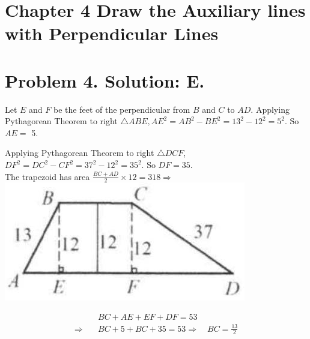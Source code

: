 \documentclass[10pt]{article}
\begin{document}
\section*{Chapter 4 Draw the Auxiliary lines with Perpendicular Lines}
\section*{Problem 4. Solution: E.}
Let \(E\) and \(F\) be the feet of the perpendicular from \(B\) and \(C\) to \(A D\). Applying\\
Pythagorean Theorem to right \(\triangle A B E, A E^{2}=A B^{2}-B E^{2}=13^{2}-12^{2}=5^{2}\). So \(A E=\) 5.

Applying Pythagorean Theorem to right \(\triangle D C F\), \(D F^{2}=D C^{2}-C F^{2}=37^{2}-12^{2}=35^{2}\). So \(D F=35\).\\
The trapezoid has area \(\frac{B C+A D}{2} \times 12=318 \Rightarrow\)\\
\includegraphics[max width=\textwidth, center]{2025_04_17_97bc1f7e44d93c271a88g-093(3)}

\[
\begin{aligned}
& B C+A E+E F+D F=53 \\
\Rightarrow \quad & B C+5+B C+35=53 \Rightarrow \quad B C=\frac{13}{2}
\end{aligned}
\]
\end{document}
